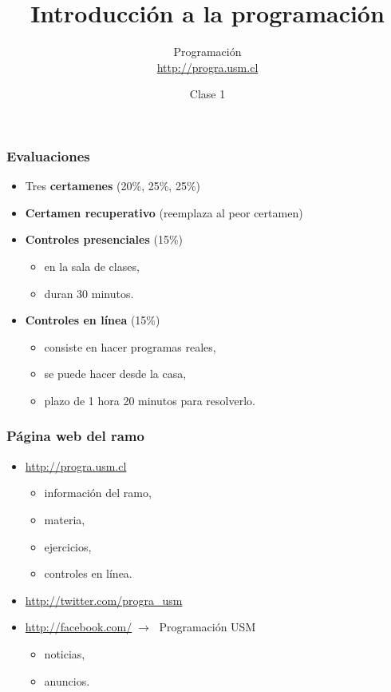 \documentclass[12pt]{beamer}
\title{Introducción a la programación}
\author{Programación \\ \url{http://progra.usm.cl}}
\date{Clase 1}
\begin{document}
  \begin{frame}
    \maketitle
  \end{frame}

  \begin{frame}
    \frametitle{Evaluaciones}
    \label{evaluaciones}
    \begin{itemize}
      \item Tres \textbf{certamenes} (20\%, 25\%, 25\%)
      \item \textbf{Certamen recuperativo}
        (reemplaza al peor certamen)
      \vfill
      \item \textbf{Controles presenciales} (15\%)
        \begin{itemize}
          \item en la sala de clases,
          \item duran 30 minutos.
        \end{itemize}
      \vfill
      \item \textbf{Controles en línea} (15\%)
        \begin{itemize}
          \item consiste en hacer programas reales,
          \item se puede hacer desde la casa,
          \item plazo de 1 hora 20 minutos para resolverlo.
        \end{itemize}
    \end{itemize}
  \end{frame}

  \begin{frame}
    \frametitle{Página web del ramo}
    \label{web}
    \begin{itemize}
      \item \url{http://progra.usm.cl}
        \begin{itemize}
          \item información del ramo,
          \item materia,
          \item ejercicios,
          \item controles en línea.
        \end{itemize}
      \vfill
      \item \url{http://twitter.com/progra_usm}
      \item \url{http://facebook.com/}\(\;\rightarrow\;\) Programación USM
        \begin{itemize}
          \item noticias,
          \item anuncios.
        \end{itemize}
    \end{itemize}
  \end{frame}
\end{document}
